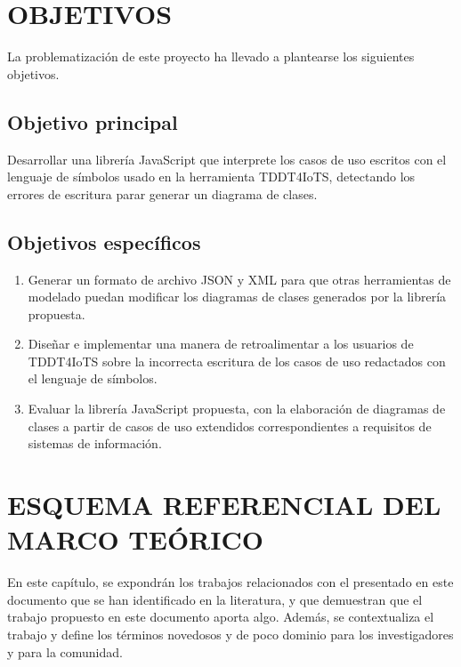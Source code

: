 \documentclass[12pt,a4paper,final, xcolor=table, table]{article}
\begin{document}
	\section{OBJETIVOS}
	
	La problematización de este proyecto ha llevado a plantearse los siguientes objetivos.
	
	\subsection{Objetivo principal}
	
	Desarrollar una librería JavaScript que interprete los casos de uso escritos con el lenguaje de símbolos usado en la herramienta TDDT4IoTS, detectando los errores de escritura parar generar un diagrama de clases. 
	
	\subsection{Objetivos específicos}
	
	\begin{enumerate}
		\item Generar un formato de archivo JSON y XML para que otras herramientas de modelado puedan modificar los diagramas de clases generados por la librería propuesta.
		
		\item Diseñar e implementar una manera de retroalimentar a los usuarios de TDDT4IoTS sobre la incorrecta escritura de los casos de uso redactados con el lenguaje de símbolos. 
		
		\item Evaluar la librería JavaScript propuesta, con la elaboración de diagramas de clases a partir de casos de uso extendidos correspondientes a requisitos de sistemas de información.
	\end{enumerate}
	
	
	\section{ESQUEMA REFERENCIAL DEL MARCO TEÓRICO}
	
	En este capítulo, se expondrán los trabajos relacionados con el presentado en este documento que se han identificado en la literatura, y que demuestran que el trabajo propuesto en este documento aporta algo. Además, se contextualiza el trabajo y define los términos novedosos y de poco dominio para los investigadores y para la comunidad.
	
\end{document}
